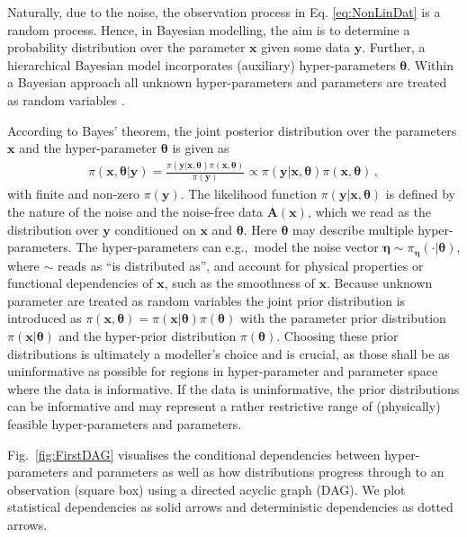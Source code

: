 Naturally, due to the noise, the observation process in Eq. \ref{eq:NonLinDat} is a random process.
Hence, in Bayesian modelling, the aim is to determine a probability distribution over the parameter $\bm{x}$ given some data $\bm{y}$.
Further, a hierarchical Bayesian model incorporates (auxiliary) hyper-parameters $\bm{\theta}$.
Within a Bayesian approach all unknown hyper-parameters and parameters are treated as random variables \cite[Chapter 3]{kaipio2005statinv}.

According to Bayes' theorem, the joint posterior distribution over the parameters $\bm{x}$ and the hyper-parameter $\bm{\theta}$ is given as
\begin{align}
	\pi(\bm{x},\bm{\theta}|\bm{y}) = \frac{ \pi(\bm{y} | \bm{x}, \bm{\theta} ) \pi(\bm{x}, \bm{\theta})}{\pi(\bm{y})} \propto \pi(\bm{y} | \bm{x}, \bm{\theta} ) \pi(\bm{x}, \bm{\theta}) \, ,
\end{align}
with finite and non-zero $\pi(\bm{y})$.
The likelihood function $\pi(\bm{y}|\bm{x},\bm{\theta})$ is defined by the nature of the noise and the noise-free data $\bm{A}(\bm{x})$, which we read as the distribution over $\bm{y}$ conditioned on $\bm{x}$ and $\bm{\theta}$.
Here $\bm{\theta}$ may describe multiple hyper-parameters.
The hyper-parameters can e.g.,~model the noise vector $\bm{\eta} \sim \pi_{\bm{\eta}}(\cdot|\bm{\theta})$, where $\sim$ reads as ``is distributed as'', and account for physical properties or functional dependencies of $\bm{x}$, such as the smoothness of $\bm{x}$.
Because unknown parameter are treated as random variables the joint prior distribution is introduced as $\pi(\bm{x}, \bm{\theta}) = \pi(\bm{x}|\bm{\theta}) \pi(\bm{\theta})$ with the parameter prior distribution $\pi(\bm{x}|\bm{\theta})$ and the hyper-prior distribution $\pi(\bm{\theta})$.
Choosing these prior distributions is ultimately a modeller's choice and is crucial, as those shall be as uninformative as possible for regions in hyper-parameter and parameter space where the data is informative.
If the data is uninformative, the prior distributions can be informative and may represent a rather restrictive range of (physically) feasible hyper-parameters and parameters.

Fig.~\ref{fig:FirstDAG} visualises the conditional dependencies between hyper-parameters and parameters as well as how distributions progress through to an observation (square box) using a directed acyclic graph (DAG).
We plot statistical dependencies as solid arrows and deterministic dependencies as dotted arrows.

